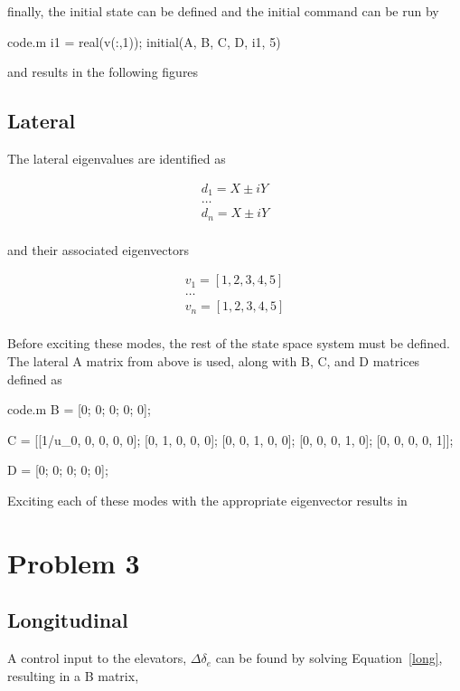 \documentclass[12pt]{article}
\begin{document}
\noindent finally, the initial state can be defined and the initial command can be run by
\begin{filecontents*}{code.m}
i1 = real(v(:,1));
initial(A, B, C, D, i1, 5)
\end{filecontents*}


\noindent and results in the following figures

\subsection{Lateral}
\noindent The lateral eigenvalues are identified as

\begin{equation*}
\begin{split}
d_1 = X \pm i Y \\
\ldots \\
d_n = X \pm i Y \\
\end{split}
\end{equation*}

\noindent and their associated eigenvectors

\begin{equation*}
\begin{split}
v_1 = [1, 2, 3, 4, 5] \\
\ldots \\
v_n = [1, 2, 3, 4, 5] \\
\end{split}
\end{equation*}

\noindent Before exciting these modes, the rest of the state space system must be defined. The lateral A matrix from above is used, along with B, C, and D matrices defined as
\begin{filecontents*}{code.m}
B = [0; 0; 0; 0; 0];

C = [[1/u_0, 0, 0, 0, 0];
     [0, 1, 0, 0, 0];
     [0, 0, 1, 0, 0];
     [0, 0, 0, 1, 0];
     [0, 0, 0, 0, 1]];

D = [0; 0; 0; 0; 0];
\end{filecontents*}


\noindent Exciting each of these modes with the appropriate eigenvector results in

\newpage
\section{Problem 3}
\subsection{Longitudinal}
A control input to the elevators, $\Delta \delta_e$ can be found by solving Equation~\ref{long}, resulting in a B matrix,
\end{document}
